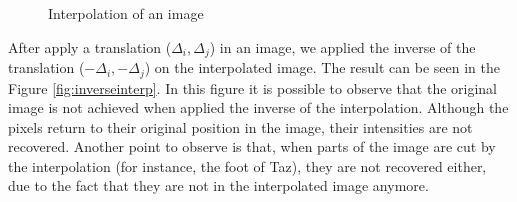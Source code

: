 \documentclass{article}
\begin{document}
	\begin{figure}[H]
		  \centering
		  \hspace{0.1cm}
		  \caption{Interpolation of an image}
		  \hspace{0.1cm}
		  \label{fig:interp}
	\end{figure}		

	

	After apply a translation ($\Delta_i,\Delta_j$) in an image, we applied the inverse of the translation ($-\Delta_i,-\Delta_j$) on the interpolated image. The result can be seen in the Figure \ref{fig:inverseinterp}. In this figure it is possible to observe that the original image is not achieved when applied the inverse of the interpolation. Although the pixels return to their original position in the image, their intensities are not recovered. Another point to observe is that, when parts of the image are cut by the interpolation (for instance, the foot of Taz), they are not recovered either, due to the fact that they are not in the interpolated image anymore.
\end{document}
